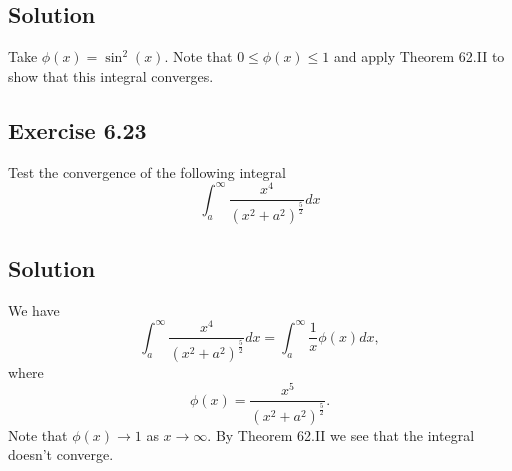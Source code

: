 \subsection*{Solution}

Take $\phi(x) = \sin^2(x)$.
Note that $0 \leq \phi(x) \leq 1$ and apply Theorem 62.II to show that this integral converges.


\subsection*{Exercise 6.23}

Test the convergence of the following integral
\begin{equation*}
    \int_a^{\infty} \frac{x^4}{(x^2 + a^2)^{\frac{5}{2}}} dx
\end{equation*}

\subsection*{Solution}

We have
\begin{equation*}
    \int_a^{\infty} \frac{x^4}{(x^2 + a^2)^{\frac{5}{2}}} dx
        = \int_a^{\infty} \frac{1}{x} \phi(x) dx,
\end{equation*}
where
\begin{equation*}
    \phi(x) = \frac{x^5}{(x^2 + a^2)^{\frac{5}{2}}}.
\end{equation*}
Note that $\phi(x) \to 1$ as $x \to \infty$.
By Theorem 62.II we see that the integral doesn't converge.

